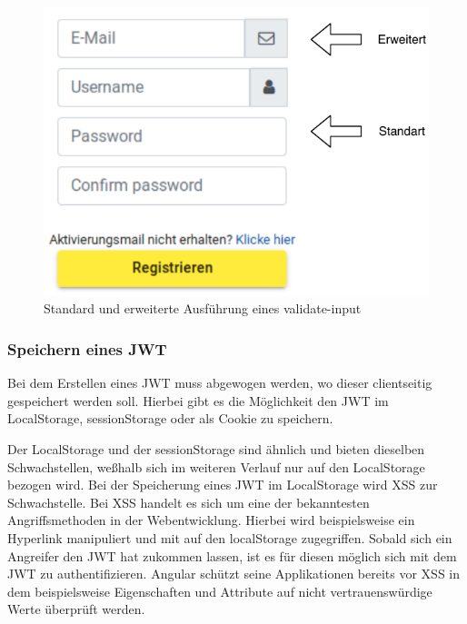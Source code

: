 \begin{description}
	\begin{figure}
		\centering
		\includegraphics[scale=0.7]{graphics/validate-input-example.pdf}
		\caption{Standard und erweiterte Ausführung eines validate-input}
		\label{fig:validate_input}
	\end{figure}

	\begin{minipage}{\linewidth}
			
	\end{minipage}
\end{description}

\subsubsection{Speichern eines \gls{JWT}}
Bei dem Erstellen eines \gls{JWT} muss abgewogen werden, wo dieser clientseitig gespeichert werden soll. Hierbei gibt es die Möglichkeit den \gls{JWT} im LocalStorage, sessionStorage oder als Cookie zu speichern.

Der LocalStorage und der sessionStorage sind ähnlich und bieten dieselben Schwachstellen, we{\ss}halb sich im weiteren Verlauf nur auf den LocalStorage bezogen wird. Bei der Speicherung eines \gls{JWT} im LocalStorage wird \gls{XSS} zur Schwachstelle. Bei \gls{XSS} handelt es sich um eine der bekanntesten Angriffsmethoden in der Webentwicklung. Hierbei wird beispielsweise ein Hyperlink manipuliert und mit \JS auf den localStorage zugegriffen. Sobald sich ein Angreifer den \gls{JWT} hat zukommen lassen, ist es für diesen möglich sich mit dem \gls{JWT} zu authentifizieren. Angular schützt seine Applikationen bereits vor \gls{XSS} in dem beispielsweise Eigenschaften und Attribute auf nicht vertrauenswürdige Werte überprüft werden.

